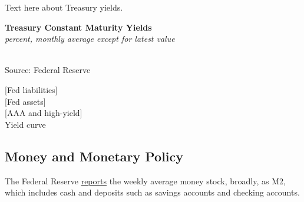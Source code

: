 \documentclass{report}
\makeatletter
\newcommand{\tbllink}[1]{\href{https://raw.githubusercontent.com/bdecon/US-chartbook/master/chartbook/data/#1}{\faTable}}
\newcommand*\short[1]{\expandafter\@gobbletwo\number\numexpr#1\relax}
\newcommand{\stdnode}[3]{\node[below, align=left, shift=({#1,#2})]{#3};}
\newcommand{\dateaxisticks}{
		date coordinates in=x, axis line style={draw=none},
		xmax={2020-02-01},
		max space between ticks=40,	    
		xtick={{1990-01-01}, {1992-01-01}, {1994-01-01}, 
			{1996-01-01}, {1998-01-01}, {2000-01-01}, 
			{2002-01-01}, {2004-01-01}, {2006-01-01},
			{2008-01-01}, {2010-01-01}, {2012-01-01}, {2014-01-01},
		    {2016-01-01}, {2018-01-01}, {2020-01-01}},
		minor xtick={{1989-01-01}, {1991-01-01}, {1993-01-01},
			{1995-01-01}, {1997-01-01}, {1999-01-01}, 
			{2001-01-01}, {2003-01-01}, {2005-01-01}, {2007-01-01},
		    {2009-01-01}, {2011-01-01}, {2013-01-01}, {2015-01-01},
		    {2017-01-01}, {2019-01-01}},
		enlarge y limits={0.06}, enlarge x limits={0.01},
		}
\newcommand{\bbar}[2]{extra #1 ticks = {{#2}}, extra #1 tick labels = ,
		extra #1 tick style = {grid=major, grid style={thick, black!25}},}
\newcommand{\stdline}[4]{\addplot[very thick, no markers, color=#1] 
		table [x=#2, y=#3, col sep=comma] {#4};	}
\newcommand{\rbars}{
		\fill[color=black!10] (axis cs:{1990-07-01},\pgfkeysvalueof{/pgfplots/ymin}) rectangle 
			(axis cs:{1991-03-01}, \pgfkeysvalueof{/pgfplots/ymax});
		\fill[color=black!10] (axis cs:{2007-12-01},\pgfkeysvalueof{/pgfplots/ymin}) rectangle 
			(axis cs:{2009-07-01}, \pgfkeysvalueof{/pgfplots/ymax});
		\fill[color=black!10] (axis cs:{2001-03-01},\pgfkeysvalueof{/pgfplots/ymin}) rectangle 
			(axis cs:{2001-11-01}, \pgfkeysvalueof{/pgfplots/ymax});}
\makeatother
\begin{document}
{{{{\begin{minipage}{0.76\textwidth}
\small Text here about Treasury yields. \\

\vspace{1mm}

\noindent \normalsize \textbf{Treasury Constant Maturity Yields}\\
\footnotesize{\textit{percent, monthly average except for latest value }}\\ 
\noindent \hspace*{-2mm} \\
\footnotesize{Source: Federal Reserve} \hfill \tbllink{rates.csv}\\

\vspace{4mm}

\normalsize

\hspace{4mm} [Fed liabilities] \\

\hspace{4mm} [Fed assets] \\

\hspace{4mm} [AAA and high-yield] \\

Yield curve 

\end{minipage}

\newpage

\begin{minipage}{0.76\textwidth}

\subsection*{\color{black!70} \seriffont Money and Monetary Policy}

\small The Federal Reserve \href{https://www.federalreserve.gov/releases/h6/current/default.htm}{reports} the weekly average money stock, broadly, as M2, which includes cash and deposits such as savings accounts and checking accounts. \\


\end{minipage}}}}}
\end{document}
